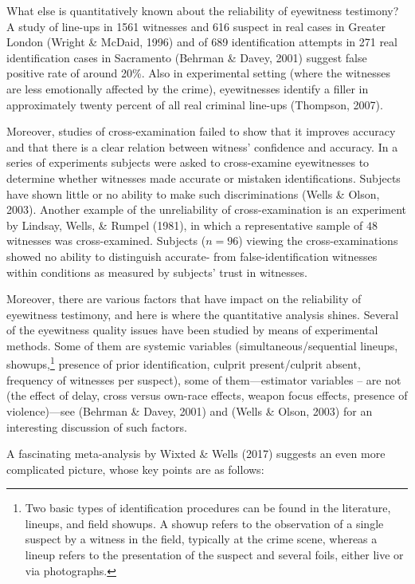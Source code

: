 \documentclass[10pt,dvipsnames,enabledeprecatedfontcommands]{scrartcl}
\begin{document}
What else is quantitatively known about the reliability of eyewitness
testimony? A study of line-ups in 1561 witnesses and 616 suspect in real
cases in Greater London (Wright \& McDaid, 1996) and of 689
identification attempts in 271 real identification cases in Sacramento
(Behrman \& Davey, 2001) suggest false positive rate of around 20\%.
Also in experimental setting (where the witnesses are less emotionally
affected by the crime), eyewitnesses identify a filler in approximately
twenty percent of all real criminal line-ups (Thompson, 2007).

Moreover, studies of cross-examination failed to show that it improves
accuracy and that there is a clear relation between witness' confidence
and accuracy. In a series of experiments subjects were asked to
cross-examine eyewitnesses to determine whether witnesses made accurate
or mistaken identifications. Subjects have shown little or no ability to
make such discriminations (Wells \& Olson, 2003). Another example of the
unreliability of cross-examination is an experiment by Lindsay, Wells,
\& Rumpel (1981), in which a representative sample of \(48\) witnesses
was cross-examined. Subjects (\(n = 96\)) viewing the cross-examinations
showed no ability to distinguish accurate- from false-identification
witnesses within conditions as measured by subjects' trust in witnesses.

Moreover, there are various factors that have impact on the reliability
of eyewitness testimony, and here is where the quantitative analysis
shines. Several of the eyewitness quality issues have been studied by
means of experimental methods. Some of them are systemic variables
(simultaneous/sequential lineups,
showups,\footnote{Two basic types of identification procedures can be found in the literature, lineups, and field showups. A showup refers to the observation of a single suspect by a witness in the field, typically at the crime scene, whereas a lineup refers to the presentation of the suspect and several foils, either live or via photographs.}
presence of prior identification, culprit present/culprit absent,
frequency of witnesses per suspect), some of them---estimator variables
-- are not (the effect of delay, cross versus own-race effects, weapon
focus effects, presence of violence)---see (Behrman \& Davey, 2001) and
(Wells \& Olson, 2003) for an interesting discussion of such factors.

A fascinating meta-analysis by Wixted \& Wells (2017) suggests an even
more complicated picture, whose key points are as follows:
\end{document}
